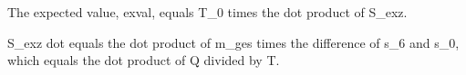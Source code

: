 The expected value, exval, equals T_0 times the dot product of S_exz.

S_exz dot equals the dot product of m_ges times the difference of s_6 and s_0, which equals the dot product of Q divided by T.